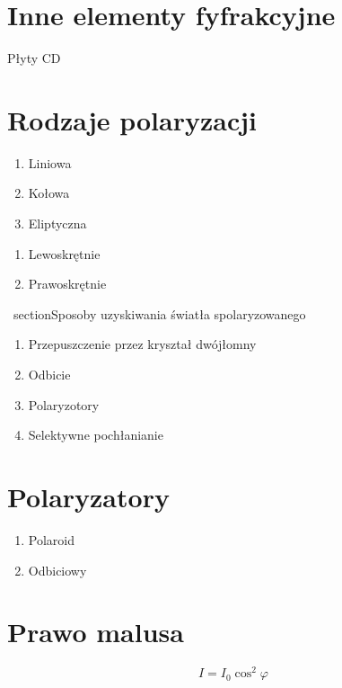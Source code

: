 \documentclass[11pt]{article}
\begin{document}
\section{Inne elementy fyfrakcyjne}
Płyty CD

\section{Rodzaje polaryzacji}
\begin{enumerate}
\item{Liniowa}
\item{Kołowa}
\item{Eliptyczna}
\end{enumerate}

\begin{enumerate}
\item{Lewoskrętnie}
\item{Prawoskrętnie}
\end{enumerate}

\ section{Sposoby uzyskiwania światła spolaryzowanego}
\begin{enumerate}
\item{Przepuszczenie przez kryształ dwójłomny}
\item{Odbicie}
\item{Polaryzotory}
\item{Selektywne pochłanianie}
\end{enumerate}
\section{Polaryzatory}
\begin{enumerate}
\item{Polaroid}
\item{Odbiciowy}
\end{enumerate}

\section{Prawo malusa}
$$ I = I_0 \cos^2{\varphi} $$
\end{document}
